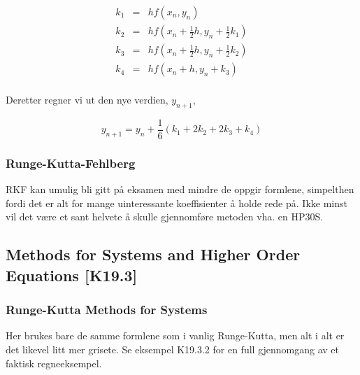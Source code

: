 \documentclass[norsk, a4paper, 12pt, titlepage]{article}
\begin{document}
\begin{eqnarray}
k_{1} & = & hf(x_{n}, y_{n}) \\
k_{2} & = & hf(x_{n} + \frac{1}{2}h, y_{n} + \frac{1}{2}k_{1}) \\
k_{3} & = & hf(x_{n} + \frac{1}{2}h, y_{n} + \frac{1}{2}k_{2}) \\
k_{4} & = & hf(x_{n} + h, y_{n} + k_{3}) \\
\end{eqnarray}

Deretter regner vi ut den nye verdien, $y_{n+1}$,

\begin{equation}
y_{n+1} = y_{n} + \frac{1}{6}(k_{1} + 2k_{2} + 2k_{3} + k_{4})
\end{equation}


\subsubsection{Runge-Kutta-Fehlberg}
RKF kan umulig bli gitt på eksamen med mindre de oppgir formlene,
simpelthen fordi det er alt for mange uinteressante koeffisienter å
holde rede på.  Ikke minst vil det være et sant helvete å skulle
gjennomføre metoden vha. en HP30S.


\subsection{Methods for Systems and Higher Order Equations [K19.3]}


\subsubsection{Runge-Kutta Methods for Systems}
Her brukes bare de samme formlene som i vanlig Runge-Kutta, men alt i
alt er det likevel litt mer grisete.  Se eksempel K19.3.2 for en full
gjennomgang av et faktisk regneeksempel.



\end{document}
